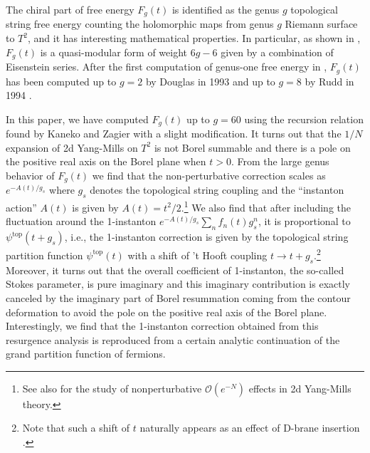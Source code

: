 \documentclass[11pt]{article}
\renewcommand{\[}{\begin{eqnarray}}
\renewcommand{\]}{\end{eqnarray}}
\begin{document}
The chiral part of free energy $F_g(t)$ is identified as the genus $g$
topological string free energy counting the holomorphic maps from genus $g$ Riemann surface
to $T^2$, and it has interesting mathematical
properties.
In particular, as shown in  \cite{zagier,dijk},
$F_g(t)$ is a quasi-modular form of weight $6g-6$
given by a combination of Eisenstein series.
After the first computation of genus-one free energy in \cite{Gross:1992tu},
$F_g(t)$ has been computed up to $g=2$ by Douglas in 1993 \cite{Douglas:1993wy}
and up to $g=8$ by Rudd in 1994 \cite{Rudd:1994ta}.

In this paper, we have computed $F_g(t)$ up to $g=60$ using 
the recursion relation found by Kaneko and Zagier \cite{zagier}
with a slight modification.
It turns out that the $1/N$ expansion of 2d Yang-Mills on $T^2$ is not Borel summable
and there is a pole on the positive real axis on the Borel plane when $t>0$.
From the large genus behavior of $F_g(t)$ we find that the non-perturbative correction scales
as $e^{-A(t)/g_s}$ where $g_s$ denotes the topological string coupling and the ``instanton action''
$A(t)$ is given by $A(t)=t^2/2$.\footnote{See 
also \cite{Matsuo:2004nn,deMelloKoch:2005rq,Dhar:2006ru,Lelli:2002gr}
for the study of nonperturbative $\mathcal{O}(e^{-N})$
effects in 2d Yang-Mills theory.}
We also find that after including the fluctuation around
the 1-instanton $e^{-A(t)/g_s}\sum_n f_n(t)g_s^n$, 
it is proportional to $\psi^{\text{top}}(t+g_s)$, i.e.,
the 1-instanton correction is given by the topological string partition
function $\psi^{\text{top}}(t)$ with a shift of 't Hooft coupling $t\to t+g_s$.\footnote{Note 
that such a shift of $t$ naturally appears as
an effect of D-brane insertion \cite{Aganagic:2003qj,Aganagic:2011mi}.}  
Moreover, it turns out that 
the overall coefficient of 1-instanton, the so-called Stokes
parameter,
is pure imaginary and this imaginary contribution is
exactly canceled by the imaginary part of Borel resummation
coming from the contour deformation to avoid the pole on the positive real axis
of the Borel plane.
Interestingly, we find that the 1-instanton correction obtained from
this resurgence analysis is reproduced from 
a certain analytic continuation of
the grand partition function of fermions. 
\end{document}
